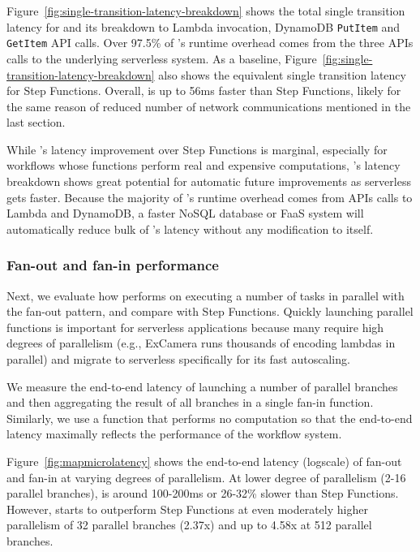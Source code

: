 Figure~\ref{fig:single-transition-latency-breakdown} shows the total single
transition latency for \name{} and its breakdown to Lambda invocation,
DynamoDB \texttt{PutItem} and \texttt{GetItem} API calls. Over 97.5\% of
\name{}'s runtime overhead comes from the three APIs calls to the underlying
serverless system. As a baseline,
Figure~\ref{fig:single-transition-latency-breakdown} also shows the equivalent
single transition latency for Step Functions. Overall, \name{} is up to 56ms
faster than Step Functions, likely for the same reason of reduced number of
network communications mentioned in the last section.

While \name{}'s latency improvement over Step Functions is marginal,
especially for workflows whose functions perform real and expensive
computations, \name{}'s latency breakdown shows great potential for automatic
future improvements as serverless gets faster. Because the majority of
\name{}'s runtime overhead comes from APIs calls to Lambda and DynamoDB, a
faster NoSQL database or FaaS system will automatically reduce bulk of
\name{}'s latency without any modification to \name{} itself.

\subsubsection{Fan-out and fan-in performance}\label{sec:eval:fan-out}

Next, we evaluate how \name{} performs on executing a number of tasks in
parallel with the fan-out pattern, and compare with Step Functions. Quickly
launching parallel functions is important for serverless applications because
many require high degrees of parallelism (e.g., ExCamera runs thousands of
encoding lambdas in parallel) and migrate to serverless specifically for its
fast autoscaling.

We measure the end-to-end latency of launching a number of parallel branches
and then aggregating the result of all branches in a single fan-in function.
Similarly, we use a function that performs no computation so that the
end-to-end latency maximally reflects the performance of the workflow system.


Figure~\ref{fig:mapmicrolatency} shows the end-to-end latency (logscale) of
fan-out and fan-in at varying degrees of parallelism. At lower degree of
parallelism (2-16 parallel branches), \name{} is around 100-200ms or 26-32\%
slower than Step Functions. However, \name{} starts to outperform Step
Functions at even moderately higher parallelism of 32 parallel branches
(2.37x) and up to 4.58x at 512 parallel branches.

